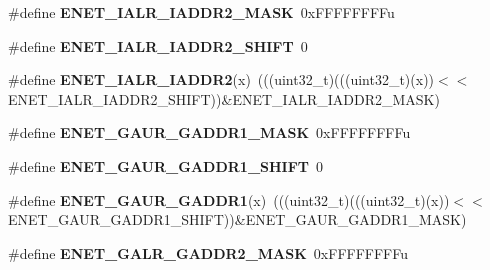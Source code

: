 \begin{DoxyCompactItemize}
\item 
\#define {\bfseries E\+N\+E\+T\+\_\+\+I\+A\+L\+R\+\_\+\+I\+A\+D\+D\+R2\+\_\+\+M\+A\+SK}~0x\+F\+F\+F\+F\+F\+F\+F\+Fu\hypertarget{group__ENET__Register__Masks_gae646937c25a2d20a02a2afc7937f9f97}{}\label{group__ENET__Register__Masks_gae646937c25a2d20a02a2afc7937f9f97}

\item 
\#define {\bfseries E\+N\+E\+T\+\_\+\+I\+A\+L\+R\+\_\+\+I\+A\+D\+D\+R2\+\_\+\+S\+H\+I\+FT}~0\hypertarget{group__ENET__Register__Masks_gadbb5d746c302629f7ed6dab197c0ed89}{}\label{group__ENET__Register__Masks_gadbb5d746c302629f7ed6dab197c0ed89}

\item 
\#define {\bfseries E\+N\+E\+T\+\_\+\+I\+A\+L\+R\+\_\+\+I\+A\+D\+D\+R2}(x)~(((uint32\+\_\+t)(((uint32\+\_\+t)(x))$<$$<$E\+N\+E\+T\+\_\+\+I\+A\+L\+R\+\_\+\+I\+A\+D\+D\+R2\+\_\+\+S\+H\+I\+FT))\&E\+N\+E\+T\+\_\+\+I\+A\+L\+R\+\_\+\+I\+A\+D\+D\+R2\+\_\+\+M\+A\+SK)\hypertarget{group__ENET__Register__Masks_ga18aa21555b866b9c80f3e29a43b650cc}{}\label{group__ENET__Register__Masks_ga18aa21555b866b9c80f3e29a43b650cc}

\item 
\#define {\bfseries E\+N\+E\+T\+\_\+\+G\+A\+U\+R\+\_\+\+G\+A\+D\+D\+R1\+\_\+\+M\+A\+SK}~0x\+F\+F\+F\+F\+F\+F\+F\+Fu\hypertarget{group__ENET__Register__Masks_ga6ae8043e613c7d0e8962e60b02b9bb04}{}\label{group__ENET__Register__Masks_ga6ae8043e613c7d0e8962e60b02b9bb04}

\item 
\#define {\bfseries E\+N\+E\+T\+\_\+\+G\+A\+U\+R\+\_\+\+G\+A\+D\+D\+R1\+\_\+\+S\+H\+I\+FT}~0\hypertarget{group__ENET__Register__Masks_ga38d4ad90575393e3e79e9436421a71b4}{}\label{group__ENET__Register__Masks_ga38d4ad90575393e3e79e9436421a71b4}

\item 
\#define {\bfseries E\+N\+E\+T\+\_\+\+G\+A\+U\+R\+\_\+\+G\+A\+D\+D\+R1}(x)~(((uint32\+\_\+t)(((uint32\+\_\+t)(x))$<$$<$E\+N\+E\+T\+\_\+\+G\+A\+U\+R\+\_\+\+G\+A\+D\+D\+R1\+\_\+\+S\+H\+I\+FT))\&E\+N\+E\+T\+\_\+\+G\+A\+U\+R\+\_\+\+G\+A\+D\+D\+R1\+\_\+\+M\+A\+SK)\hypertarget{group__ENET__Register__Masks_ga18686df13fea6ddef8e4e7583648df89}{}\label{group__ENET__Register__Masks_ga18686df13fea6ddef8e4e7583648df89}

\item 
\#define {\bfseries E\+N\+E\+T\+\_\+\+G\+A\+L\+R\+\_\+\+G\+A\+D\+D\+R2\+\_\+\+M\+A\+SK}~0x\+F\+F\+F\+F\+F\+F\+F\+Fu\hypertarget{group__ENET__Register__Masks_ga8e26a6cd7140a83bfb1209d2359f3442}{}\label{group__ENET__Register__Masks_ga8e26a6cd7140a83bfb1209d2359f3442}


\end{DoxyCompactItemize}
